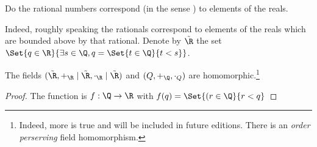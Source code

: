 

Do the rational numbers correspond (in the sense ) to elements of the reals.


Indeed, roughly speaking the rationals correspond to elements of the reals which are bounded above by that rational.
Denote by $\tilde{\R}$ the set $\Set{q \in \R}{\exists s \in \Q, q = \Set{t \in \Q}{t < s}}$.

\begin{proposition}
  The fields $(\tilde{\R}, +_{\R} \mid \tilde{\R}, \cdot_{\R} \mid \tilde{\R})$ and $(Q, +_{\Q}, \cdot_{Q})$ are homomorphic.\footnote{Indeed, more is true and will be included in future editions. There is an \textit{order perserving} field homomorphism.}
\end{proposition}
\begin{proof}
  The function is $f: \Q \to \R$ with $f(q) = \Set{(r \in \Q}{r < q}$
\end{proof}

\blankpage
